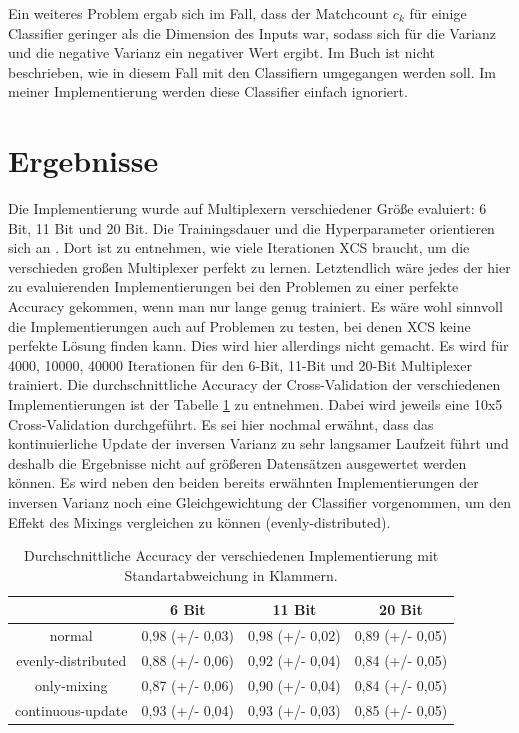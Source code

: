 \documentclass{ocsmnar}
\begin{document}
Ein weiteres Problem ergab sich im Fall, dass der Matchcount $c_k$ für einige Classifier geringer als die Dimension des Inputs war, sodass sich für die Varianz und die negative Varianz ein negativer Wert ergibt. Im Buch ist nicht beschrieben, wie in diesem Fall mit den Classifiern umgegangen werden soll. Im meiner Implementierung werden diese Classifier einfach ignoriert. 



\section{Ergebnisse}
Die Implementierung wurde auf Multiplexern verschiedener Größe evaluiert: 6 Bit, 11 Bit und 20 Bit. Die Trainingsdauer und die Hyperparameter orientieren sich an \cite{iqbal13}. Dort ist zu entnehmen, wie viele Iterationen XCS braucht, um die verschieden großen Multiplexer perfekt zu lernen. Letztendlich wäre jedes der hier zu evaluierenden Implementierungen bei den Problemen zu einer perfekte Accuracy gekommen, wenn man nur lange genug trainiert. Es wäre wohl sinnvoll die Implementierungen auch auf Problemen zu testen, bei denen XCS keine perfekte Lösung finden kann. Dies wird hier allerdings nicht gemacht. 
Es wird für 4000, 10000, 40000 Iterationen für den 6-Bit, 11-Bit und 20-Bit Multiplexer trainiert. 
Die durchschnittliche Accuracy der Cross-Validation der verschiedenen Implementierungen ist der Tabelle \ref{accuracy-tabelle}
 zu entnehmen. Dabei wird jeweils eine 10x5 Cross-Validation durchgeführt. Es sei hier nochmal erwähnt, dass das kontinuierliche Update der inversen Varianz zu sehr langsamer Laufzeit führt und deshalb die Ergebnisse nicht auf größeren Datensätzen ausgewertet werden können. 
Es wird neben den beiden bereits erwähnten Implementierungen der inversen Varianz noch eine Gleichgewichtung der Classifier vorgenommen, um den Effekt des Mixings vergleichen zu können (evenly-distributed).  

\begin{table}
    
\begin{center}\label{accuracy-tabelle}
\begin{tabular}{|c|c|c|c|}
    \hline
    & 6 Bit & 11 Bit & 20 Bit \\
    \hline
    normal & 0,98 (+/- 0,03) & 0,98 (+/- 0,02) & 0,89 (+/- 0,05) \\
    \hline
    evenly-distributed & 0,88 (+/- 0,06) & 0,92 (+/- 0,04) & 0,84 (+/- 0,05) \\
    \hline
    only-mixing & 0,87 (+/- 0,06) & 0,90 (+/- 0,04) & 0,84 (+/- 0,05) \\
    \hline
    continuous-update & 0,93 (+/- 0,04) & 0,93 (+/- 0,03) & 0,85 (+/- 0,05) \\
    \hline
\end{tabular}
\end{center}
\caption{Durchschnittliche Accuracy der verschiedenen Implementierung mit Standartabweichung in Klammern. }
\end{table}
\end{document}
